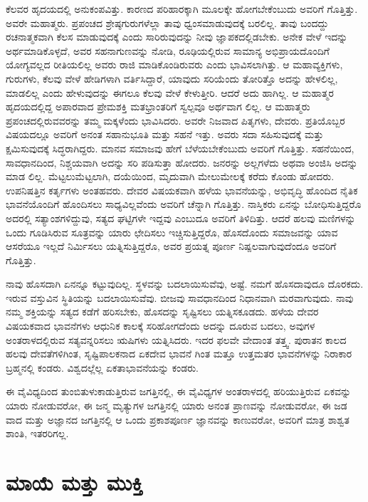 ಕೆಲವರ ಹೃದಯದಲ್ಲಿ ಅನುಕಂಪವಿತ್ತು. ಕಾರಣದ ಪರಿಹಾರಕ್ಕಾಗಿ ಮೂಲಕ್ಕೇ ಹೋಗಬೇಕೆಂಬುದು ಅವರಿಗೆ ಗೊತ್ತಿತ್ತು. ಅವರೇ ಮಹಾತ್ಮರು. ಪ್ರಪಂಚದ ಶ್ರೇಷ್ಠಗುರುಗಳೆಲ್ಲಾ ತಾವು ಧ್ವಂಸಮಾಡುವುದಕ್ಕೆ ಬರಲಿಲ್ಲ. ತಾವು ಬಂದದ್ದು ರಚನಾತ್ಮಕವಾಗಿ ಕೆಲಸ ಮಾಡುವುದಕ್ಕೆ ಎಂದು ಸಾರಿರುವುದನ್ನು ನೀವು ಜ್ಞಾಪಕದಲ್ಲಿಡಬೇಕು. ಅನೇಕ ವೇಳೆ ಇದನ್ನು ಅರ್ಥಮಾಡಿಕೊಳ್ಳದೆ, ಅವರ ಸಹನಾಗುಣವನ್ನು ನೋಡಿ, ರೂಢಿಯಲ್ಲಿರುವ ಸಾಮಾನ್ಯ ಅಭಿಪ್ರಾಯದೊಂದಿಗೆ ಯೋಗ್ಯವಲ್ಲದ ರೀತಿಯಲಿಲ್ಲ ಅವರು ರಾಜಿ ಮಾಡಿಕೊಂಡಿರುವರು ಎಂದು ಭಾವಿಸಲಾಗಿತ್ತು. ಆ ಮಹಾವ್ಯಕ್ತಿಗಳು, ಗುರುಗಳು, ಕೆಲವು ವೇಳೆ ಹೇಡಿಗಳಾಗಿ ವರ್ತಿಸಿದ್ದಾರೆ, ಯಾವುದು ಸರಿಯೆಂದು ತೋರಿತ್ತೊ ಅದನ್ನು ಹೇಳಲಿಲ್ಲ, ಮಾಡಲಿಲ್ಲ ಎಂದು ಹೇಳುವುದನ್ನು ಈಗಲೂ ಕೆಲವು ವೇಳೆ ಕೇಳುತ್ತೀರಿ. ಆದರೆ ಅದು ಹಾಗಿಲ್ಲ. ಆ ಮಹಾತ್ಮರ ಹೃದಯದಲ್ಲಿದ್ದ ಅಪಾರವಾದ ಪ್ರೇಮಶಕ್ತಿ ಮತಭ್ರಾಂತರಿಗೆ ಸ್ವಲ್ಪವೂ ಅರ್ಥವಾಗ ಲಿಲ್ಲ. ಆ ಮಹಾತ್ಮರು ಪ್ರಪಂಚದಲ್ಲಿರುವವರನ್ನು ತಮ್ಮ ಮಕ್ಕಳೆಂದು ಭಾವಿಸಿದರು. ಅವರೇ ನಿಜವಾದ ಪಿತೃಗಳು, ದೇವರು. ಪ್ರತಿಯೊಬ್ಬರ ವಿಷಯದಲ್ಲೂ ಅವರಿಗೆ ಅನಂತ ಸಹಾನುಭೂತಿ ಮತ್ತು ಸಹನೆ ಇತ್ತು. ಅವರು ಸದಾ ಸಹಿಸುವುದಕ್ಕೆ ಮತ್ತು ಕ್ಷಮಿಸುವುದಕ್ಕೆ ಸಿದ್ಧರಾಗಿದ್ದರು. ಮಾನವ ಸಮಾಜವು ಹೇಗೆ ಬೆಳೆಯಬೇಕೆಂಬುದು ಅವರಿಗೆ ಗೊತ್ತಿತ್ತು. ಸಹನೆಯಿಂದ, ಸಾವಧಾನದಿಂದ, ನಿಶ್ಚಯವಾಗಿ ಅದನ್ನು ಸರಿ ಪಡಿಸುತ್ತಾ ಹೋದರು. ಜನರನ್ನು ಅಲ್ಲಗಳೆದು ಅಥವಾ ಅಂಜಿಸಿ ಅದನ್ನು ಮಾಡ ಲಿಲ್ಲ. ಮೆಟ್ಟಲುಮೆಟ್ಟಲಾಗಿ, ದಯೆಯಿಂದ, ಮೃದುವಾಗಿ ಮೇಲುಮೇಲಕ್ಕೆ ಕರೆದು ಕೊಂಡು ಹೋದರು. ಉಪನಿಷತ್ತಿನ ಕರ್ತೃಗಳು ಅಂತಹವರು. ದೇವರ ವಿಷಯಕವಾಗಿ ಹಳೆಯ ಭಾವನೆಯನ್ನು, ಅಭಿವೃದ್ಧಿ ಹೊಂದಿದ ನೈತಿಕ ಭಾವನೆಯೊಂದಿಗೆ ಹೊಂದಿಸಲು ಸಾಧ್ಯವಿಲ್ಲವೆಂದು ಅವರಿಗೆ ಚೆನ್ನಾಗಿ ಗೊತ್ತಿತ್ತು. ನಾಸ್ತಿಕರು ಏನನ್ನು ಬೋಧಿಸುತ್ತಿದ್ದರೊ ಅದರಲ್ಲಿ ಸತ್ಯಾಂಶಗಳಿದ್ದುವು, ಸತ್ಯದ ಘಟ್ಟಿಗಳೇ ಇದ್ದವು ಎಂಬುದೂ ಅವರಿಗೆ ತಿಳಿದಿತ್ತು. ಆದರೆ ಹಲವು ಮಣಿಗಳನ್ನು ಒಂದು ಗೂಡಿಸಿರುವ ಸೂತ್ರವನ್ನು ಯಾರು ಛೇದಿಸಲು ಇಚ್ಚಿಸುತ್ತಿದ್ದರೊ, ಹೊಸದೊಂದು ಸಮಾಜವನ್ನು ಯಾವ ಆಸರೆಯೂ ಇಲ್ಲದೆ ನಿರ್ಮಿಸಲು ಯತ್ನಿಸುತ್ತಿದ್ದರೊ, ಅವರ ಪ್ರಯತ್ನ ಪೂರ್ಣ ನಿಷ್ಪಲವಾಗುವುದೆಂದೂ ಅವರಿಗೆ ಗೊತ್ತಿತ್ತು.

ನಾವು ಹೊಸದಾಗಿ ಏನನ್ನೂ ಕಟ್ಟುವುದಿಲ್ಲ. ಸ್ಥಳವನ್ನು ಬದಲಾಯಿಸುವೆವು, ಅಷ್ಟೆ. ನಮಗೆ ಹೊಸದಾವುದೂ ದೊರಕದು. ಇರುವ ವಸ್ತುವಿನ ಸ್ಥಿತಿಯನ್ನು ಬದಲಾಯಿಸುವೆವು. ಬೀಜವು ಸಾವಧಾನದಿಂದ ನಿಧಾನವಾಗಿ ಮರವಾಗುವುದು. ನಾವು ನಮ್ಮ ಶಕ್ತಿಯನ್ನು ಸತ್ಯದ ಕಡೆಗೆ ಹರಿಸಬೇಕು, ಹೊಸದನ್ನು ಸೃಷ್ಟಿಸಲು ಯತ್ನಿಸಕೂಡದು. ಹಳೆಯ ದೇವರ ವಿಷಯಕವಾದ ಭಾವನೆಗಳು ಆಧುನಿಕ ಕಾಲಕ್ಕೆ ಸರಿಹೋಗದೆಂದು ಅದನ್ನು ದೂರುವ ಬದಲು, ಅವುಗಳ ಅಂತರಾಳದಲ್ಲಿರುವ ಸತ್ಯವನ್ನರಿಸಲು ಋಷಿಗಳು ಯತ್ನಿಸಿದರು. ಇದರ ಫಲವೇ ವೇದಾಂತ ತತ್ತ್ವ. ಪುರಾತನ ಕಾಲದ ಹಲವು ದೇವತೆಗಳಿಗಿಂತ, ಸೃಷ್ಟಿಪಾಲಕನಾದ ಏಕದೇವ ಭಾವನೆ ಗಿಂತ ಮತ್ತೂ ಉತ್ತಮತರ ಭಾವನೆಗಳನ್ನು ನಿರಾಕಾರ ಬ್ರಹ್ಮನಲ್ಲಿ ಕಂಡರು. ವಿಶ್ವದಲ್ಲೆಲ್ಲ ಏಕತಾಭಾವನೆಯನ್ನು ಕಂಡರು.

ಈ ವೈವಿಧ್ಯದಿಂದ ತುಂಬಿತುಳುಕಾಡುತ್ತಿರುವ ಜಗತ್ತಿನಲ್ಲಿ, ಈ ವೈವಿಧ್ಯಗಳ ಅಂತರಾಳದಲ್ಲಿ ಹರಿಯುತ್ತಿರುವ ಏಕವನ್ನು ಯಾರು ನೋಡುವರೋ, ಈ ಜನ್ಮ ಮೃತ್ಯುಗಳ ಜಗತ್ತಿನಲ್ಲಿ ಯಾರು ಅನಂತ ಪ್ರಾಣವನ್ನು ನೋಡುವರೋ, ಈ ಜಡ ವಾದ ಮತ್ತು ಅಜ್ಞಾನದ ಜಗತ್ತಿನಲ್ಲಿ ಆ ಒಂದು ಪ್ರಕಾಶಪೂರ್ಣ ಜ್ಞಾನವನ್ನು ಕಾಣುವರೋ, ಅವರಿಗೆ ಮಾತ್ರ ಶಾಶ್ವತ ಶಾಂತಿ, ಇತರರಿಗಲ್ಲ.

\chapter{ಮಾಯೆ ಮತ್ತು ಮುಕ್ತಿ}

